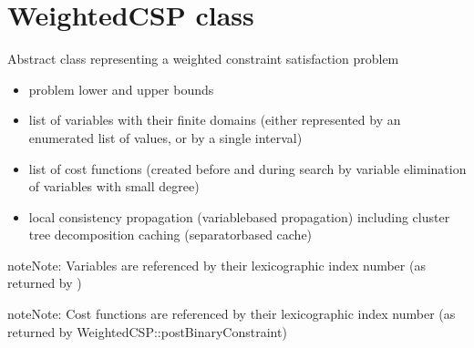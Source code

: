 \documentclass[letterpaper,10pt,openany,oneside,english]{sphinxmanual}
\begin{document}
\chapter{WeightedCSP class}
\label{\detokenize{ref/ref_cpp:weightedcsp-class}}

\begin{fulllineitems}
\label{\detokenize{ref/ref_cpp:_CPPv411WeightedCSP}}\label{\detokenize{ref/ref_cpp:_CPPv311WeightedCSP}}\label{\detokenize{ref/ref_cpp:_CPPv211WeightedCSP}}\label{\detokenize{ref/ref_cpp:WeightedCSP}}
\pysigstartsignatures
\pysigstartmultiline
{}
\pysigstopmultiline
\pysigstopsignatures
\sphinxAtStartPar
Abstract class {\hyperref[\detokenize{ref/ref_cpp:classWeightedCSP}]{}} representing a weighted constraint satisfaction problem\begin{itemize}
\item {} 
\sphinxAtStartPar
problem lower and upper bounds

\item {} 
\sphinxAtStartPar
list of variables with their finite domains (either represented by an enumerated list of values, or by a single interval)

\item {} 
\sphinxAtStartPar
list of cost functions (created before and during search by variable elimination of variables with small degree)

\item {} 
\sphinxAtStartPar
local consistency propagation (variable\sphinxhyphen{}based propagation) including cluster tree decomposition caching (separator\sphinxhyphen{}based cache)

\end{itemize}


\begin{sphinxadmonition}{note}{Note:}
\sphinxAtStartPar
Variables are referenced by their lexicographic index number (as returned by  {\hyperref[\detokenize{ref/ref_cpp:classWeightedCSP_1a2329c94c60817153e45de627c79f8281}]{}}) 
\end{sphinxadmonition}

\begin{sphinxadmonition}{note}{Note:}
\sphinxAtStartPar
Cost functions are referenced by their lexicographic index number (as returned by  WeightedCSP::postBinaryConstraint) 
\end{sphinxadmonition}


\end{fulllineitems}
\end{document}
